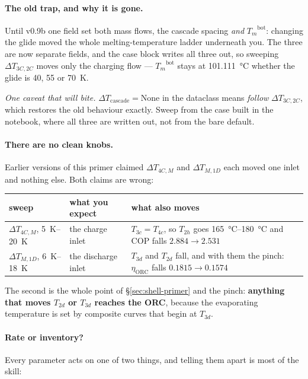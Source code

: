 \documentclass[11pt,a4paper]{article}
\providecommand{\celsius}{\degreeCelsius}
\newcommand{\Tm}{\ensuremath{T_{m}}}
\begin{document}
\paragraph{The old trap, and why it is gone.} Until v0.9b one field set both
mass flows, the cascade spacing \emph{and} $\Tm^{\mathrm{bot}}$: changing the
glide moved the whole melting-temperature ladder underneath you. The three are
now separate fields, and the case block writes all three out, so sweeping
$\Delta T_{3C,2C}$ moves only the charging flow --- $\Tm^{\mathrm{bot}}$ stays
at \SI{101.111}{\celsius} whether the glide is \num{40}, \num{55} or
\SI{70}{\kelvin}.

\emph{One caveat that will bite.} $\Delta T_{\mathrm{cascade}}=\mathrm{None}$
in the dataclass means \emph{follow} $\Delta T_{3C,2C}$, which restores the old
behaviour exactly. Sweep from the case built in the notebook, where all three
are written out, not from the bare default.

\paragraph{There are no clean knobs.} Earlier versions of this primer claimed
$\Delta T_{4C,M}$ and $\Delta T_{M,1D}$ each moved one inlet and nothing else.
Both claims are wrong:

\begin{center}
\begin{tabular}{@{}l l l@{}}
\toprule
sweep & what you expect & what also moves \\
\midrule
$\Delta T_{4C,M}$, \SIrange{5}{20}{\kelvin} & the charge inlet
  & $T_{3c}=T_{4c}$, so $T_{2h}$ goes \SIrange{165}{180}{\celsius}
    and $\mathrm{COP}$ falls $2.884\to2.531$ \\
$\Delta T_{M,1D}$, \SIrange{6}{18}{\kelvin} & the discharge inlet
  & $T_{3d}$ and $T_{2d}$ fall, and with them the pinch:
    $\eta_{\mathrm{ORC}}$ falls $0.1815\to0.1574$ \\
\bottomrule
\end{tabular}
\end{center}

\noindent
The second is the whole point of \S\ref{sec:shell-primer} and the pinch:
\textbf{anything that moves $T_{2d}$ or $T_{3d}$ reaches the ORC}, because the
evaporating temperature is set by composite curves that begin at $T_{3d}$.

\paragraph{Rate or inventory?}
Every parameter acts on one of two things, and telling them apart is most of
the skill:
\end{document}
